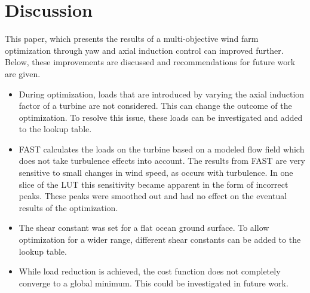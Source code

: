 \section{Discussion}
This paper, which presents the results of a multi-objective wind farm optimization through yaw and axial induction control can improved further. Below, these improvements are discussed and recommendations for future work are given.
\begin{itemize}
	\item During optimization, loads that are introduced by varying the axial induction factor of a turbine are not considered. This can change the outcome of the optimization. To resolve this issue, these loads can be investigated and added to the lookup table.
	\item FAST calculates the loads on the turbine based on a modeled flow field which does not take turbulence effects into account. The results from FAST are very sensitive to small changes in wind speed, as occurs with turbulence. In one slice of the LUT this sensitivity became apparent in the form of incorrect peaks. These peaks were smoothed out and had no effect on the eventual results of the optimization. 
	\item The shear constant was set for a flat ocean ground surface. To allow optimization for a wider range, different shear constants can be added to the lookup table.
	\item While load reduction is achieved, the cost function does not completely converge to a global minimum. This could be investigated in future work.
\end{itemize}